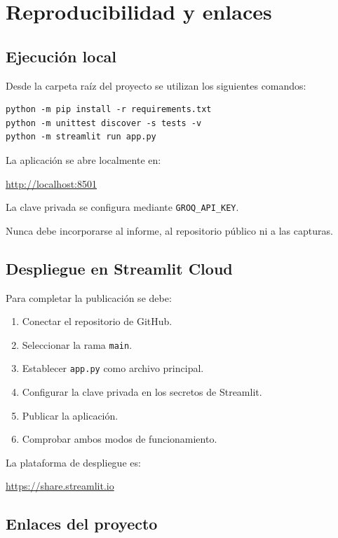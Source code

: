 \documentclass[11pt,a4paper]{article}
\begin{document}
\section{Reproducibilidad y enlaces}

\subsection{Ejecución local}

Desde la carpeta raíz del proyecto se utilizan
los siguientes comandos:

\begin{lstlisting}
python -m pip install -r requirements.txt
python -m unittest discover -s tests -v
python -m streamlit run app.py
\end{lstlisting}

La aplicación se abre localmente en:

\url{http://localhost:8501}

La clave privada se configura mediante
\texttt{GROQ\_API\_KEY}.

Nunca debe incorporarse al informe,
al repositorio público ni a las capturas.

\subsection{Despliegue en Streamlit Cloud}

Para completar la publicación se debe:

\begin{enumerate}
\item Conectar el repositorio de GitHub.
\item Seleccionar la rama \texttt{main}.
\item Establecer \texttt{app.py} como archivo principal.
\item Configurar la clave privada en los secretos de Streamlit.
\item Publicar la aplicación.
\item Comprobar ambos modos de funcionamiento.
\end{enumerate}

La plataforma de despliegue es:

\url{https://share.streamlit.io}

\subsection{Enlaces del proyecto}
\end{document}
